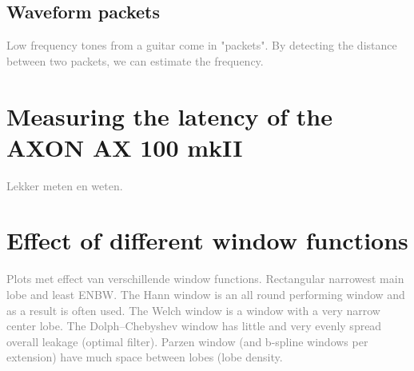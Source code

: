 \documentclass[10pt,twocolumn]{article}
\begin{document}
\subsection{Waveform packets}  \label{sub:waveform_packet}
\textcolor{gray}{Low frequency tones from a guitar come in "packets". By detecting the distance between two packets, we can estimate the frequency.}



\appendix
\section{Measuring the latency of the AXON AX 100 mkII}  \label{sec:ax100}
\textcolor{gray}{Lekker meten en weten.}



\section{Effect of different window functions}  \label{sec:windows}
\textcolor{gray}{Plots met effect van verschillende window functions. Rectangular narrowest main lobe and least ENBW. The Hann window is an all round performing window and as a result is often used. The Welch window is a window with a very narrow center lobe. The Dolph–Chebyshev window has little and very evenly spread overall leakage (optimal filter). Parzen window (and b-spline windows per extension) have much space between lobes (lobe density.}
\end{document}

